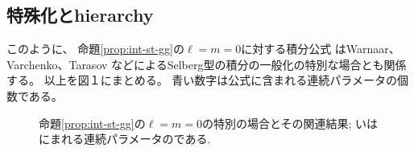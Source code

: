 \subsection{特殊化とhierarchy}
このように、
	命題\ref{prop:int-st-gg}の$\ell = m = 0$に対する積分公式
	はWarnaar、Varchenko、Tarasov などによるSelberg型の積分の一般化の特別な場合とも関係する。
	以上を図１にまとめる。
	{青}い{数字}は{公式}に{含}まれる連続パラメータの{個数}である。
			\begin{figure*}[h]
				\centering
				\begin{tikzpicture}
				
				\end{tikzpicture}
				\caption{
					命題\ref{prop:int-st-gg}の$\ell=m=0$の特別の場合とその関連結果;
いはにまれる連続パラメータのである.
				}
				\label{fig:intdep}
			\end{figure*}
